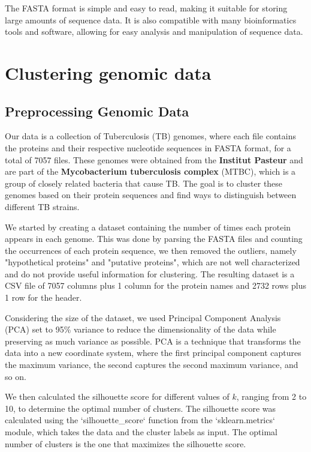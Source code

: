 The FASTA format is simple and easy to read, making it suitable for storing large amounts of sequence data. It is also compatible
with many bioinformatics tools and software, allowing for easy analysis and manipulation of sequence data.

\chapter{Clustering genomic data}
\label{chap:clustering_genomic_data}

\section{Preprocessing Genomic Data}
\label{sec:preprocessing_genomic_data}

Our data is a collection of Tuberculosis (TB) genomes, where each file contains the proteins and their respective nucleotide sequences
in FASTA format, for a total of 7057 files. These genomes were obtained from the \textbf{Institut Pasteur} and are part of the
\textbf{Mycobacterium tuberculosis complex} (MTBC), which is a group of closely related bacteria that cause TB. The goal is to cluster
these genomes based on their protein sequences and find ways to distinguish between different TB strains.

We started by creating a dataset containing the number of times each protein appears in each genome. This was done by
parsing the FASTA files and counting the occurrences of each protein sequence, we then removed the outliers, namely
"hypothetical proteins" and "putative proteins", which are not well characterized and do not provide useful information
for clustering. The resulting dataset is a CSV file of 7057 columns plus 1 column for the protein names and 2732 rows
plus 1 row for the header.

Considering the size of the dataset, we used Principal Component Analysis (PCA) set to 95\% variance to reduce the dimensionality
of the data while preserving as much variance as possible. PCA is a technique that transforms the data into a new coordinate
system, where the first principal component captures the maximum variance, the second captures the second maximum variance,
and so on.

We then calculated the silhouette score for different values of $k$, ranging from 2 to 10, to determine the optimal number
of clusters. The silhouette score was calculated using the `silhouette_score` function from the `sklearn.metrics` module,
which takes the data and the cluster labels as input. The optimal number of clusters is the one that maximizes the silhouette
score.

